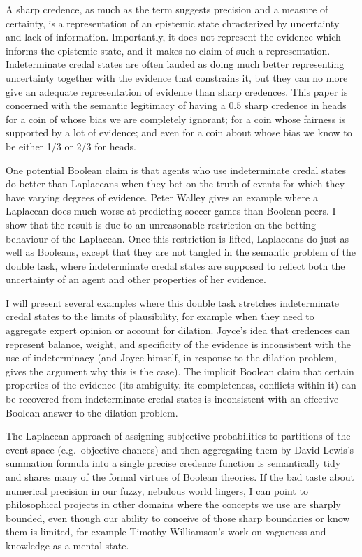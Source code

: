 \documentclass[11pt]{article}
\begin{document}
A sharp credence, as much as the term suggests precision and a measure
of certainty, is a representation of an epistemic state chracterized
by uncertainty and lack of information. Importantly, it does not
represent the evidence which informs the epistemic state, and it makes
no claim of such a representation. Indeterminate credal states are
often lauded as doing much better representing uncertainty together
with the evidence that constrains it, but they can no more give an
adequate representation of evidence than sharp credences. This paper
is concerned with the semantic legitimacy of having a $0.5$ sharp
credence in heads for a coin of whose bias we are completely ignorant;
for a coin whose fairness is supported by a lot of evidence; and even
for a coin about whose bias we know to be either 1/3 or 2/3 for heads.

One potential Boolean claim is that agents who use indeterminate
credal states do better than Laplaceans when they bet on the truth of
events for which they have varying degrees of evidence. Peter Walley
gives an example where a Laplacean does much worse at predicting
soccer games than Boolean peers. I show that the result is due to an
unreasonable restriction on the betting behaviour of the Laplacean.
Once this restriction is lifted, Laplaceans do just as well as
Booleans, except that they are not tangled in the semantic problem of
the double task, where indeterminate credal states are supposed to
reflect both the uncertainty of an agent and other properties of her
evidence.

I will present several examples where this double task stretches
indeterminate credal states to the limits of plausibility, for example
when they need to aggregate expert opinion or account for dilation.
Joyce's idea that credences can represent balance, weight, and
specificity of the evidence is inconsistent with the use of
indeterminacy (and Joyce himself, in response to the dilation problem,
gives the argument why this is the case). The implicit Boolean claim
that certain properties of the evidence (its ambiguity, its
completeness, conflicts within it) can be recovered from indeterminate
credal states is inconsistent with an effective Boolean answer to the
dilation problem.

The Laplacean approach of assigning subjective probabilities to
partitions of the event space (e.g.\ objective chances) and then
aggregating them by David Lewis's summation formula into a single
precise credence function is semantically tidy and shares many of the
formal virtues of Boolean theories. If the bad taste about numerical
precision in our fuzzy, nebulous world lingers, I can point to
philosophical projects in other domains where the concepts we use are
sharply bounded, even though our ability to conceive of those sharp
boundaries or know them is limited, for example Timothy Williamson's
work on vagueness and knowledge as a mental state.
\end{document}
